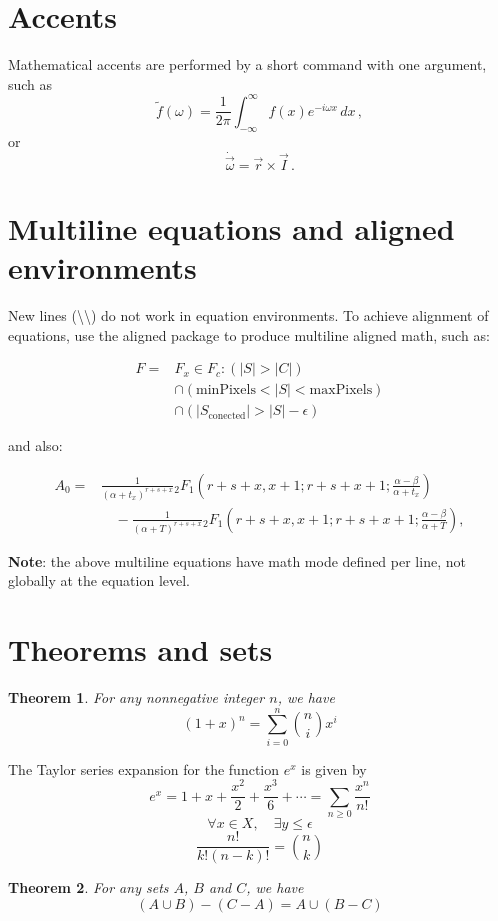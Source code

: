 \section{Accents}
Mathematical accents are performed by a short command with one
argument, such as
\[
    \tilde f(\omega)=\frac{1}{2\pi}
    \int_{-\infty}^\infty f(x)e^{-i\omega x}\,dx\,,
\]
or
\[
    \dot{\vec \omega}=\vec r\times\vec I\,.
\]

\section{Multiline equations and aligned environments}

New lines (\textbackslash \textbackslash) do not work in equation environments. To achieve alignment of equations, use the aligned  package to produce multiline aligned math, such as:

\begin{center}
    \begin{align}
        F = & F_{x} \in  F_{c} : (|S| > |C|)                        \\
            & \cap (\mathrm{minPixels}  < |S| < \mathrm{maxPixels}) \\
            & \cap (|S_{\mathrm{conected}}| > |S| - \epsilon)
    \end{align}
\end{center}

and also:
\newline
\begin{center}
    \begin{align}
        A_0 = & \frac{1}{(\alpha+t_x)^{r+s+x}}{}_2 F_1\left( r+s+x,x+1;r+s+x+1;\frac{\alpha-\beta}{\alpha + t_x} \right)      \\
              & \quad - \frac{1}{(\alpha+T)^{r+s+x}}{}_2 F_1\left( r+s+x,x+1;r+s+x+1;\frac{\alpha-\beta}{\alpha + T} \right),
    \end{align}
\end{center}

\textbf{Note}: the above multiline equations have math mode defined per line, not globally at the equation level.

\section{Theorems and sets}
\newtheorem{theorem}{Theorem}
\newtheorem{corollary}[theorem]{Corollary}
\newtheorem{lemma}[theorem]{Lemma}
\newtheorem{definition}[theorem]{Definition}
\begin{theorem}
    For any nonnegative integer $n$, we have
    $$(1+x)^n = \sum_{i=0}^n {n \choose i} x^i$$
\end{theorem}
The Taylor series expansion for the function $e^x$ is given by
\begin{equation}
    e^x = 1 + x + \frac{x^2}{2} + \frac{x^3}{6} + \cdots = \sum_{n\geq 0} \frac{x^n}{n!}
\end{equation}
\[ \forall x \in X, \quad \exists y \leq \epsilon \]
\[ \frac{n!}{k!(n-k)!} = \binom{n}{k} \]
\begin{theorem}
    For any sets $A$, $B$ and $C$, we have
    $$ (A\cup B)-(C-A) = A \cup (B-C)$$
\end{theorem}
